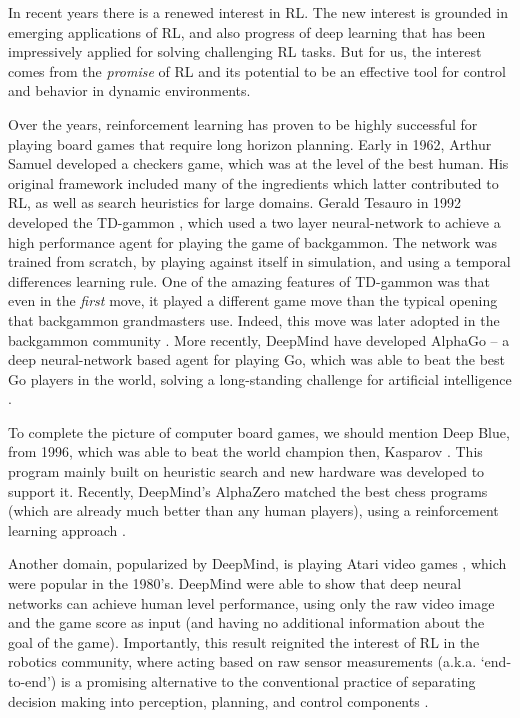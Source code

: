In recent years there is a renewed interest in RL. The new interest is grounded in  emerging applications
of RL, and also progress of deep learning that
has been impressively applied for solving challenging RL tasks. 
But for us, the interest comes from the {\em promise} of RL and its
potential to be an effective tool for control and behavior in dynamic environments.

Over the years, reinforcement learning has proven to be highly
successful for playing board games that require long horizon planning. 
Early in 1962, Arthur Samuel \cite{Samuel62} developed a checkers game, which was at
the level of the best human. His original framework included many of
the ingredients which latter contributed to RL,
as well as search heuristics for large domains.
Gerald
Tesauro in 1992 developed the TD-gammon \cite{Tesauro95}, which used a two layer
neural-network to achieve a high performance agent for playing the game of backgammon. The network was trained from scratch, by playing against itself in simulation, and using a temporal differences learning rule. One of the amazing features
of TD-gammon was that even in the {\em first} move, it played a
different game move than the typical opening that backgammon grandmasters use. Indeed, this move was later adopted in the backgammon community \cite{Tesauro02}.
More recently, DeepMind have developed AlphaGo -- a deep neural-network based agent
for playing Go, which was able to beat the best Go players in the world, solving a long-standing challenge for artificial intelligence \cite{SilverHMGSDSAPL16}. 

To complete the picture of computer board games, we should mention
Deep Blue, from 1996, which was able to beat the world champion then,
Kasparov \cite{DeepBlue}. This program mainly built on heuristic search and new hardware was developed to support it. Recently, DeepMind's
AlphaZero matched the best chess
programs (which are already much better than any human players), using a reinforcement learning approach \cite{silver2017mastering}.

Another domain, popularized by DeepMind, is playing Atari video
games \cite{mnih2015human}, which were popular in the 1980's. DeepMind were able to
show that deep neural networks can achieve human level performance,
using only the raw video image and the game score as input (and having no additional
information about the goal of the game). Importantly, this result reignited the interest of RL in the robotics community, where acting based on raw sensor measurements (a.k.a. `end-to-end') is a promising alternative to the conventional practice of separating decision making into perception, planning, and control components \cite{levine2016end}.

